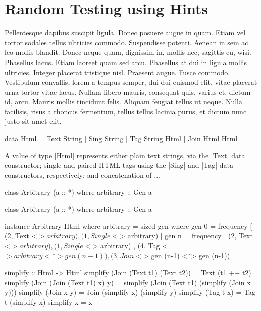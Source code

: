 \section{Random Testing using Hints}
\label{sec:sources}


Pellentesque dapibus suscipit ligula. Donec posuere augue in quam. Etiam vel
tortor sodales tellus ultricies commodo. Suspendisse potenti. Aenean in sem ac
leo mollis blandit. Donec neque quam, dignissim in, mollis nec, sagittis eu,
wisi. Phasellus lacus. Etiam laoreet quam sed arcu. Phasellus at dui in ligula
mollis ultricies. Integer placerat tristique nisl. Praesent augue. Fusce
commodo. Vestibulum convallis, lorem a tempus semper, dui dui euismod elit,
vitae placerat urna tortor vitae lacus. Nullam libero mauris, consequat quis,
varius et, dictum id, arcu. Mauris mollis tincidunt felis. Aliquam feugiat
tellus ut neque. Nulla facilisis, risus a rhoncus fermentum, tellus tellus
lacinia purus, et dictum nunc justo sit amet elit.

\begin{code}
data Html
  =  Text  String
  |  Sing  String
  |  Tag   String Html
  |  Join  Html Html
\end{code}

A value of type |Html| represents either plain text strings, via the |Text| data
constructor; single and paired HTML tags using the |Sing| and |Tag| data
constructors, respectively; and concatenation of ...

\begin{code}
class Arbitrary (a :: *) where
  arbitrary :: Gen a
\end{code}

\begin{code}
class Arbitrary (a :: *) where
  arbitrary :: Gen a
\end{code}

\begin{code}
instance Arbitrary Html where
  arbitrary = sized gen
    where
      gen 0 = frequency
        [  (2,  Text    <$> arbitrary)
        ,  (1,  Single  <$> arbitrary) ]
      gen n = frequency
        [  (2,  Text    <$> arbitrary)
        ,  (1,  Single  <$> arbitrary)
        ,  (4,  Tag     <$> arbitrary  <*> gen (n-1))
        ,  (3,  Join    <$> gen (n-1)  <*> gen (n-1)) ]
\end{code} %



\begin{code}
simplify :: Html -> Html
simplify (Join (Text t1) (Text t2))
  = Text (t1 ++ t2)
simplify (Join (Join (Text t1) x) y)
  = simplify (Join (Text t1) (simplify (Join x y)))
simplify (Join x y)
  = Join (simplify x) (simplify y)
simplify (Tag t x)
  = Tag t (simplify x)
simplify x = x
\end{code}
